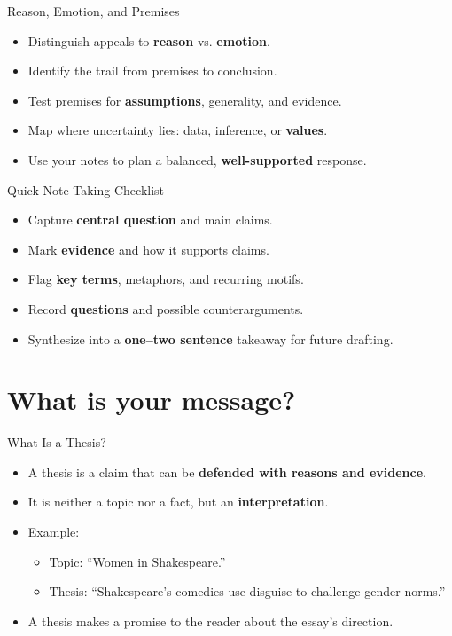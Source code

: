 \documentclass[aspectratio=169]{beamer}
\begin{document}
\begin{frame}{Reason, Emotion, and Premises}
\begin{itemize}
  \item Distinguish appeals to \textbf{reason} vs. \textbf{emotion}.
  \item Identify the trail from premises to conclusion.
  \item Test premises for \textbf{assumptions}, generality, and evidence.
  \item Map where uncertainty lies: data, inference, or \textbf{values}.
  \item Use your notes to plan a balanced, \textbf{well-supported} response.
\end{itemize}
\end{frame}

\begin{frame}{Quick Note-Taking Checklist}
\begin{itemize}
  \item Capture \textbf{central question} and main claims.
  \item Mark \textbf{evidence} and how it supports claims.
  \item Flag \textbf{key terms}, metaphors, and recurring motifs.
  \item Record \textbf{questions} and possible counterarguments.
  \item Synthesize into a \textbf{one–two sentence} takeaway for future drafting.
\end{itemize}
\end{frame}




\section{What is your message?}


\begin{frame}{What Is a Thesis?}
\begin{itemize}
  \item A thesis is a claim that can be \textbf{defended with reasons and evidence}.
  \item It is neither a topic nor a fact, but an \textbf{interpretation}.
  \item Example:  
    \begin{itemize}
      \item Topic: “Women in Shakespeare.”  
      \item Thesis: “Shakespeare’s comedies use disguise to challenge gender norms.”
    \end{itemize}
  \item A thesis makes a promise to the reader about the essay’s direction.
\end{itemize}
\end{frame}
\end{document}
